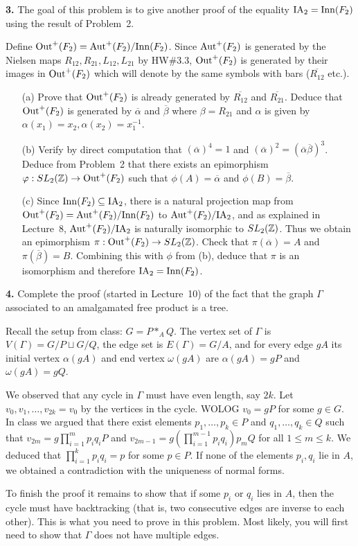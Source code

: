 \documentclass[12pt]{amsart}
\begin{document}
{\bf 3.} The goal of this problem is to give another proof of the equality
${\rm IA}_2={\rm Inn}(F_2)$ using the result of Problem~2.

Define ${\rm Out}^+(F_2)={\rm Aut}^+(F_2)/{\rm Inn}(F_2)$. Since ${\rm Aut}^+(F_2)$ is generated
by the Nielsen maps $R_{12}, R_{21}, L_{12}, L_{21}$ by HW\#3.3, ${\rm Out}^+(F_2)$
is generated by their images in ${\rm Out}^+(F_2)$ which will denote by 
the same symbols with bars ($\overline{R_{12}}$ etc.).


\begin{itemize}

\item[(a)] Prove that ${\rm Out}^+(F_2)$ is already generated by $\overline{R_{12}}$
and $\overline{R_{21}}$. Deduce that ${\rm Out}^+(F_2)$ is generated by
$\overline{\alpha}$ and $\overline{\beta}$ where $\beta=R_{21}$ and 
$\alpha$ is given by $\alpha(x_1)=x_2, \alpha(x_2)=x_1^{-1}$.

\item[(b)] Verify by direct computation that $(\overline \alpha)^4=1$ and $(\overline \alpha)^2=(\overline \alpha\overline \beta)^3$. Deduce from 
Problem~2 that there exists an epimorphism ${\varphi}:SL_2({\mathbb Z})\to {\rm Out}^+(F_2)$
such that $\phi(A)=\overline \alpha$ and $\phi(B)=\overline \beta$.


\item[(c)] Since ${\rm Inn}(F_2)\subseteq {\rm IA}_2$, there is a natural
projection map from ${\rm Out}^+(F_2)={\rm Aut}^+(F_2)/{\rm Inn}(F_2)$ 
to ${\rm Aut}^+(F_2)/{\rm IA}_2$, and as explained in Lecture~8, ${\rm Aut}^+(F_2)/{\rm IA}_2$
is naturally isomorphic to $SL_2({\mathbb Z})$. Thus we obtain an epimorphism $\pi:{\rm Out}^+(F_2)\to SL_2({\mathbb Z})$. Check that $\pi(\overline \alpha)=A$
and $\pi(\overline \beta)=B$. Combining this with $\phi$ from (b),
deduce that $\pi$ is an isomorphism and therefore ${\rm IA}_2={\rm Inn}(F_2)$.
\end{itemize}

{\bf 4.} Complete the proof (started in Lecture~10) of the fact that the graph $\Gamma$ associated to an amalgamated free product is a tree.

Recall the setup from class: $G=P\ast_{A}Q$. The vertex set of $\Gamma$
is $V(\Gamma)=G/P\sqcup G/Q$, the edge set is $E(\Gamma)=G/A$, and for every
edge $gA$ its initial vertex $\alpha(gA)$ and end vertex $\omega(gA)$ are 
$\alpha(gA)=gP$ and $\omega(gA)=gQ$.

We observed that any cycle in $\Gamma$ must have even length, say $2k$.
Let $v_0,v_1,\ldots, v_{2k}=v_0$ by the vertices in the cycle. WOLOG 
$v_0=gP$ for some $g\in G$. In class we argued that there exist
elements $p_1,\ldots, p_k\in P$ and $q_1,\ldots, q_k\in Q$ such that
$v_{2m}=g\prod\limits_{i=1}^m p_iq_i P$ and $v_{2m-1}=g(\prod\limits_{i=1}^{m-1} p_iq_i)p_m Q$
for all $1\leq m\leq k$. We deduced that $\prod\limits_{i=1}^k p_iq_i=p$ for some
$p\in P$. If none of the elements $p_i,q_i$ lie in $A$, we obtained a contradiction with the
uniqueness of normal forms.

To finish the proof it remains to show that if some $p_i$ or $q_i$ lies in $A$,
then the cycle must have backtracking (that is, two consecutive edges are inverse
to each other). This is what you need to prove in this problem. Most likely, 
you will first need to show that $\Gamma$ does not have multiple edges.
\end{document}
